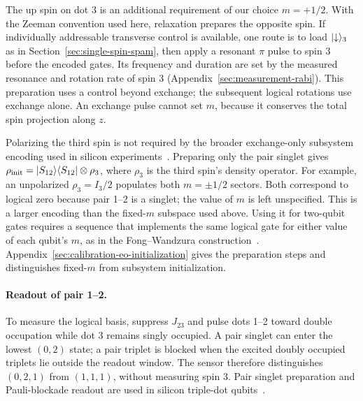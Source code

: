 The up spin on dot 3 is an additional requirement of our choice
$m=+1/2$. With the Zeeman convention used here, relaxation prepares
the opposite spin. If individually addressable transverse control
is available, one route is to load $\lvert \downarrow\rangle_3$ as in
Section~\ref{sec:single-spin-spam}, then apply a resonant $\pi$ pulse
to spin 3 before the encoded gates. Its frequency and duration are
set by the measured resonance and rotation rate of spin 3
(Appendix~\ref{sec:measurement-rabi}). This preparation uses a control
beyond exchange; the subsequent logical rotations use exchange alone.
An exchange pulse cannot set $m$, because it conserves
the total spin projection along $z$.

Polarizing the third spin is not required by the broader
exchange-only subsystem encoding used in silicon
experiments~\cite{Weinstein2023}.
Preparing only the pair singlet gives
$\rho_{\mathrm{init}}=\lvert S_{12}\rangle\langle S_{12}\rvert\otimes\rho_3$,
where $\rho_3$ is the third spin's density operator.
For example, an unpolarized $\rho_3=I_3/2$ populates both
$m=\pm1/2$ sectors. Both correspond to logical zero because pair
1--2 is a singlet; the value of $m$ is left unspecified.
This is a larger encoding than the fixed-$m$ subspace used above.
Using it for two-qubit gates requires a sequence that implements
the same logical gate for either value of each qubit's $m$, as in
the Fong--Wandzura construction~\cite{FongWandzura2011,Weinstein2023}.
Appendix~\ref{sec:calibration-eo-initialization} gives the preparation
steps and distinguishes fixed-$m$ from subsystem initialization.

\paragraph{Readout of pair 1--2.}
To measure the logical basis, suppress $J_{23}$ and pulse dots 1--2
toward double occupation while dot 3 remains singly occupied.
A pair singlet can enter the lowest $(0,2)$ state; a pair triplet
is blocked when the excited doubly occupied triplets lie outside
the readout window. The sensor therefore distinguishes $(0,2,1)$
from $(1,1,1)$, without measuring spin 3.
Pair singlet preparation and Pauli-blockade readout are used in
silicon triple-dot qubits~\cite{Blumoff2022}.

